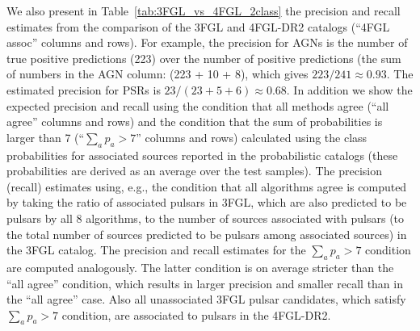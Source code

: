 \documentclass{aa}
\begin{document}
We also present in Table~\ref{tab:3FGL_vs_4FGL_2class} the precision and recall estimates from the comparison of the 3FGL and 4FGL-DR2 catalogs (``4FGL assoc'' columns and rows).
For example, the precision for AGNs is the number of true positive predictions (223) over the number of positive predictions (the sum of numbers in the AGN column: (223 + 10 + 8), which gives $223 / 241 \approx 0.93$.
The estimated precision for PSRs is $ 23 / (23 + 5 + 6) \approx 0.68$.
In addition we show the expected precision and recall using the condition that all
methods agree (``all agree'' columns and rows) and the condition that the sum of probabilities is larger than 7 (``$\sum_a p_a > 7$'' columns and rows) calculated using the class probabilities for associated sources reported in the probabilistic catalogs (these probabilities are derived as an average over the test samples).
The precision (recall) estimates using, e.g., the condition that all algorithms agree is computed by taking the ratio of associated pulsars in 3FGL, which are also predicted to be pulsars by all 8 algorithms, to the number of sources associated with pulsars (to the total number of sources predicted to be pulsars among associated sources) in the 3FGL catalog.
The precision and recall estimates for the $\sum_a p_a > 7$ condition are computed analogously.
The latter condition is on average stricter than the ``all agree'' condition, which results in larger precision and smaller recall than in the ``all agree'' case.
Also all unassociated 3FGL pulsar candidates, which satisfy $\sum_a p_a > 7$ condition, are associated to pulsars in the 4FGL-DR2.
\end{document}
